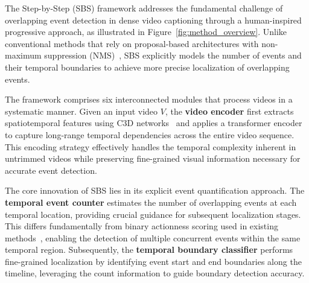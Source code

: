 
The Step-by-Step (SBS) framework addresses the fundamental challenge of overlapping event detection in dense video captioning through a human-inspired progressive approach, as illustrated in Figure~\ref{fig:method_overview}. 
Unlike conventional methods that rely on proposal-based architectures with non-maximum suppression (NMS)~\cite{Krishna2017-pw,Li2018-ll}, SBS explicitly models the number of events and their temporal boundaries to achieve more precise localization of overlapping events.

The framework comprises six interconnected modules that process videos in a systematic manner.
Given an input video $V$, the \textbf{video encoder} first extracts spatiotemporal features using C3D networks~\cite{Tran2015-uq} and applies a transformer encoder~\cite{Vaswani2017-sc} to capture long-range temporal dependencies across the entire video sequence.
This encoding strategy effectively handles the temporal complexity inherent in untrimmed videos while preserving fine-grained visual information necessary for accurate event detection.

The core innovation of SBS lies in its explicit event quantification approach.
The \textbf{temporal event counter} estimates the number of overlapping events at each temporal location, providing crucial guidance for subsequent localization stages.
This differs fundamentally from binary actionness scoring used in existing methods~\cite{lin2018bsn,buch2017sst}, enabling the detection of multiple concurrent events within the same temporal region.
Subsequently, the \textbf{temporal boundary classifier} performs fine-grained localization by identifying event start and end boundaries along the timeline, leveraging the count information to guide boundary detection accuracy.

